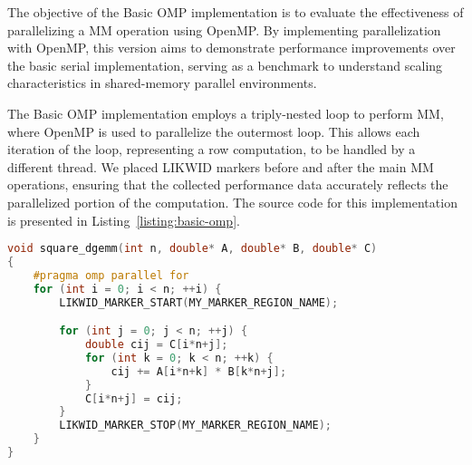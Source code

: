 The objective of the Basic OMP implementation is to evaluate the effectiveness of parallelizing a MM operation using OpenMP. By implementing parallelization with OpenMP, this version aims to demonstrate performance improvements over the basic serial implementation, serving as a benchmark to understand scaling characteristics in shared-memory parallel environments.

The Basic OMP implementation employs a triply-nested loop to perform MM, where OpenMP is used to parallelize the outermost loop. This allows each iteration of the loop, representing a row computation, to be handled by a different thread. We placed LIKWID markers before and after the main MM operations, ensuring that the collected performance data accurately reflects the parallelized portion of the computation. The source code for this implementation is presented in Listing~\ref{listing:basic-omp}.


\begin{lstlisting}[caption={\textbf{Basic OpenMP implementation of MM.} The implementation uses a triply-nested loop with OpenMP parallelism. LIKWID markers are added within the parallel block, specifically before and after the core matrix multiply code, to ensure performance data collection is focused only on the parallel MM operations.},label={listing:basic-omp},name=basic-serial,float=htbp,style=mystyle,language=C++]
void square_dgemm(int n, double* A, double* B, double* C) 
{
    #pragma omp parallel for
    for (int i = 0; i < n; ++i) {        
        LIKWID_MARKER_START(MY_MARKER_REGION_NAME);

        for (int j = 0; j < n; ++j) {
            double cij = C[i*n+j];
            for (int k = 0; k < n; ++k) {
                cij += A[i*n+k] * B[k*n+j];
            }
            C[i*n+j] = cij;
        }
        LIKWID_MARKER_STOP(MY_MARKER_REGION_NAME);
    }
}
\end{lstlisting}
